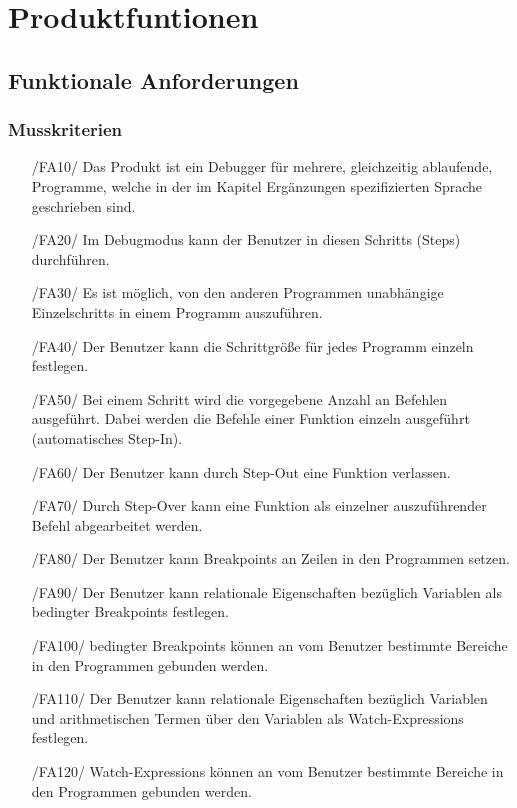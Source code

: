 \documentclass[parskip=full]{scrartcl}
\begin{document}
\newpage

\section{Produktfuntionen}
	 	\subsection{Funktionale Anforderungen}
 		\subsubsection{Musskriterien}
		\begin{itemize}
		\item[/FA10/] Das Produkt ist ein \gls{Debugger} für mehrere, gleichzeitig ablaufende, Programme, welche in der im Kapitel Ergänzungen spezifizierten Sprache geschrieben sind.
		\item[/FA20/] Im \gls{Debugmodus} kann der Benutzer in diesen \glspl{Schritt} (Steps) durchführen.
		\item[/FA30/] Es ist möglich, von den anderen Programmen unabhängige \glspl{Einzelschritt} in einem Programm auszuführen.
		\item[/FA40/] Der Benutzer kann die Schrittgröße für jedes Programm einzeln festlegen.
		\item[/FA50/] Bei einem \gls{Schritt} wird die vorgegebene Anzahl an Befehlen ausgeführt. Dabei werden die Befehle einer Funktion einzeln ausgeführt (automatisches Step-In). 
		\item[/FA60/] Der Benutzer kann durch \gls{Step-Out} eine Funktion verlassen.
		\item[/FA70/] Durch \gls{Step-Over} kann eine Funktion als einzelner auszuführender Befehl abgearbeitet werden.
		\item[/FA80/] Der Benutzer kann \glspl{Breakpoint} an Zeilen in den Programmen setzen.
		\item[/FA90/] Der Benutzer kann relationale Eigenschaften bezüglich Variablen als \glspl{bedingter Breakpoint} festlegen.
		\item[/FA100/] \Glspl{bedingter Breakpoint} können an vom Benutzer bestimmte Bereiche in den Programmen gebunden werden.
		\item[/FA110/] Der Benutzer kann relationale Eigenschaften bezüglich Variablen und arithmetischen Termen über den Variablen als \glspl{Watch-Expression} festlegen.
		\item[/FA120/] \glspl{Watch-Expression} können an vom Benutzer bestimmte Bereiche in den Programmen gebunden werden.

\end{itemize}
\end{document}
